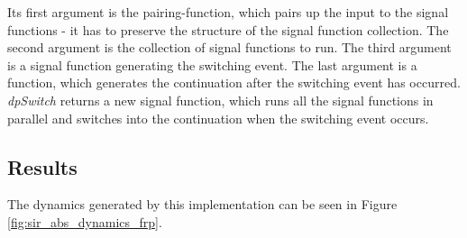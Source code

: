Its first argument is the pairing-function, which pairs up the input to the signal functions - it has to preserve the structure of the signal function collection. The second argument is the collection of signal functions to run. The third argument is a signal function generating the switching event. The last argument is a function, which generates the continuation after the switching event has occurred. \textit{dpSwitch} returns a new signal function, which runs all the signal functions in parallel and switches into the continuation when the switching event occurs. %

\subsection{Results}
\label{sub:timedriven_results}

The dynamics generated by this implementation can be seen in Figure \ref{fig:sir_abs_dynamics_frp}. 

